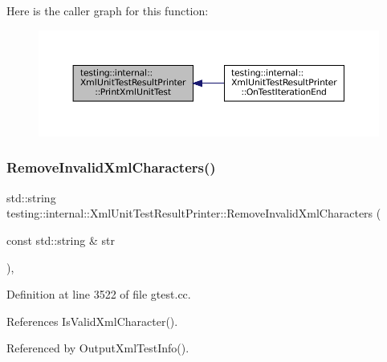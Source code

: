 Here is the caller graph for this function\+:
\nopagebreak
\begin{figure}[H]
\begin{center}
\leavevmode
\includegraphics[width=350pt]{classtesting_1_1internal_1_1XmlUnitTestResultPrinter_a3be1c8766241d0f34cdf59b45a52f73b_icgraph}
\end{center}
\end{figure}
\mbox{\label{classtesting_1_1internal_1_1XmlUnitTestResultPrinter_aa14cb72f42a346841482cbafa65e3155}} 
\subsubsection{\texorpdfstring{Remove\+Invalid\+Xml\+Characters()}{RemoveInvalidXmlCharacters()}}
{\footnotesize\ttfamily std\+::string testing\+::internal\+::\+Xml\+Unit\+Test\+Result\+Printer\+::\+Remove\+Invalid\+Xml\+Characters (\begin{DoxyParamCaption}\item[{const std\+::string \&}]{str }\end{DoxyParamCaption})\hspace{0.3cm}{\ttfamily [static]}, {\ttfamily [private]}}



Definition at line 3522 of file gtest.\+cc.



References Is\+Valid\+Xml\+Character().



Referenced by Output\+Xml\+Test\+Info().


